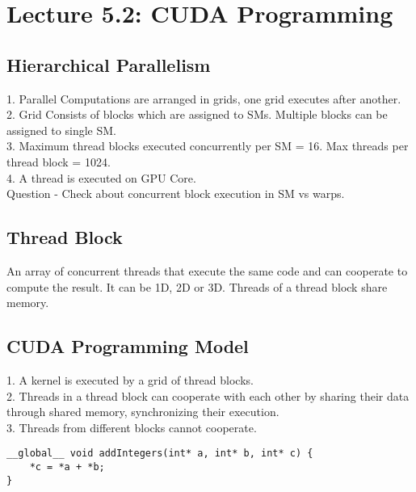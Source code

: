 \section*{Lecture 5.2: CUDA Programming}
\subsection*{Hierarchical Parallelism}
1. Parallel Computations are arranged in grids, one grid executes after another. \\
2. Grid Consists of blocks which are assigned to SMs. Multiple blocks can be assigned to single SM. \\
3. Maximum thread blocks executed concurrently per SM = 16. Max threads per thread block = 1024. \\
4. A thread is executed on GPU Core. \\

Question - Check about concurrent block execution in SM vs warps. 

\subsection*{Thread Block}
An array of concurrent threads that execute the same code and can cooperate to compute the result. It can be 1D, 2D or 3D. Threads of a thread block share memory.

\subsection*{CUDA Programming Model}
1. A kernel is executed by a grid of thread blocks. \\
2. Threads in a thread block can cooperate with each other by sharing their data through shared memory, synchronizing their execution. \\
3. Threads from different blocks cannot cooperate. \\

\begin{lstlisting}
__global__ void addIntegers(int* a, int* b, int* c) {
    *c = *a + *b;
}
\end{lstlisting}

